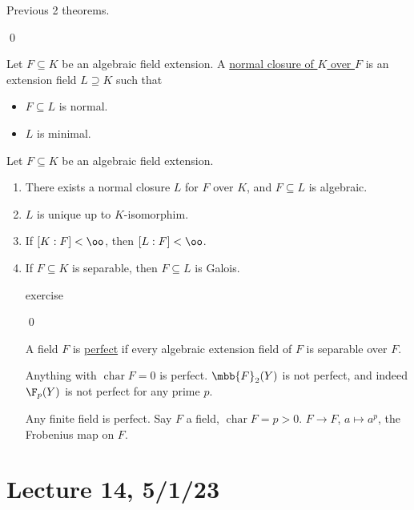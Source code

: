 \documentclass[x11names,reqno,14pt]{extarticle}
\DeclareMathOperator{\Char}{char}
\begin{document}
\proof

Previous 2 theorems.

\qed


Let $F \subseteq K$ be an algebraic field extension. A \underline{normal closure of $K$ over $F$} is an extension field $L \supseteq K$ such that

\begin{itemize}

\item $F \subseteq L$ is normal. 

\item $L$ is minimal. 

\end{itemize}

\thm

Let $F \subseteq K$ be an algebraic field extension. 

\begin{enumerate}

\item There exists a normal closure $L$ for $F$ over $K$, and $F \subseteq L$ is algebraic. 

\item $L$ is unique up to $K$-isomorphim.

\item If $[K:F]<\oo$, then $[L:F]<\oo$. 

\item If $F \subseteq K$ is separable, then $F \subseteq L$ is Galois. 

\proof

exercise

\qed


A field $F$ is \underline{perfect} if every algebraic extension field of $F$ is separable over $F$. 

\exm

Anything with $\Char F = 0$ is perfect. $\mbb{F}_2(Y)$ is not perfect, and indeed $\F_p(Y)$ is not perfect for any prime $p$. 

\exm

Any finite field is perfect. Say $F$ a field, $\Char F = p > 0$. $F \to F$, $a \mapsto a^p$, the Frobenius map on $F$.


\end{enumerate}

\section*{Lecture 14, 5/1/23}
\end{document}
